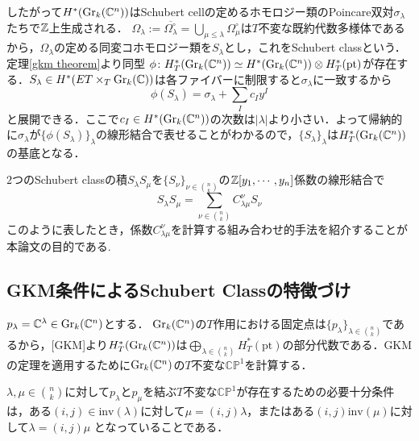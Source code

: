 したがって$H^*(\text{Gr}_k(\mathbb{C}^n))$はSchubert cellの定めるホモロジー類のPoincare双対$\sigma_\lambda$たちで$\mathbb{Z}$上生成される．
$\Omega_\lambda:=\overline{\Omega_\lambda^\circ}=\bigcup_{\mu\leq\lambda}\Omega_\mu^\circ$は$T$不変な既約代数多様体である\cite{fulton young tableaux}から，$\Omega_\lambda$の定める同変コホモロジー類を$S_\lambda$とし，これをSchubert classという．
定理\ref{gkm theorem}より同型
$\phi\colon H^*_T(\text{Gr}_k(\mathbb{C}^n))\simeq H^*(\text{Gr}_k(\mathbb{C}^n))\otimes H^*_T(\text{pt})$が存在する．$S_\lambda\in H^*(ET\times_T\text{Gr}_k(\mathbb{C}))$は各ファイバーに制限すると$\sigma_\lambda$に一致するから
\[
\phi(S_\lambda) = \sigma_\lambda + \sum_{I}c_Iy^I
\]
と展開できる．ここで$c_I\in H^*(\text{Gr}_k(\mathbb{C}^n))$の次数は$|\lambda|$より小さい．よって帰納的に$\sigma_\lambda$が$\{\phi(S_\lambda)\}_\lambda$の線形結合で表せることがわかるので，$\{S_\lambda\}_\lambda$は$H^*_T(\text{Gr}_k(\mathbb{C}^n))$の基底となる．


$2$つのSchubert classの積$S_\lambda S_\mu$を$\{S_\nu\}_{\nu\in\binom{n}{k}}$の$\mathbb{Z}[y_1,\cdots,y_n]$係数の線形結合で
\begin{equation}\label{LRcoeff}
  S_\lambda S_\mu=\sum_{\nu\in\binom{n}{k}}C^\nu_{\lambda\mu}S_\nu
\end{equation}
このように表したとき，係数$C^{\nu}_{\lambda\mu}$を計算する組み合わせ的手法を紹介することが本論文の目的である.





\subsection{GKM条件によるSchubert Classの特徴づけ}

$p_\lambda = \mathbb{C}^\lambda\in\text{Gr}_k(\mathbb{C}^n)$とする．
$\text{Gr}_k(\mathbb{C}^n)$の$T$作用における固定点は$\{p_\lambda\}_{\lambda\in\binom{n}{k}}$であるから，[GKM]より$H^*_T(\text{Gr}_k(\mathbb{C}^n))$は$\bigoplus_{\lambda\in\binom{n}{k}}H^*_T(\text{pt})$の部分代数である．GKMの定理を適用するために$\text{Gr}_k(\mathbb{C}^n)$の$T$不変な$\mathbb{CP}^1$を計算する．

\begin{prop}
  $\lambda,\mu\in\binom{n}{k}$に対して$p_\lambda$と$p_\mu$を結ぶ$T$不変な$\mathbb{CP}^1$が存在するための必要十分条件は，ある$(i, j)\in\text{inv}(\lambda)$に対して$\mu = (i, j)\lambda$，またはある$(i,j)\text{inv}(\mu)$に対して$\lambda = (i, j)\mu$
  となっていることである．
\end{prop}

